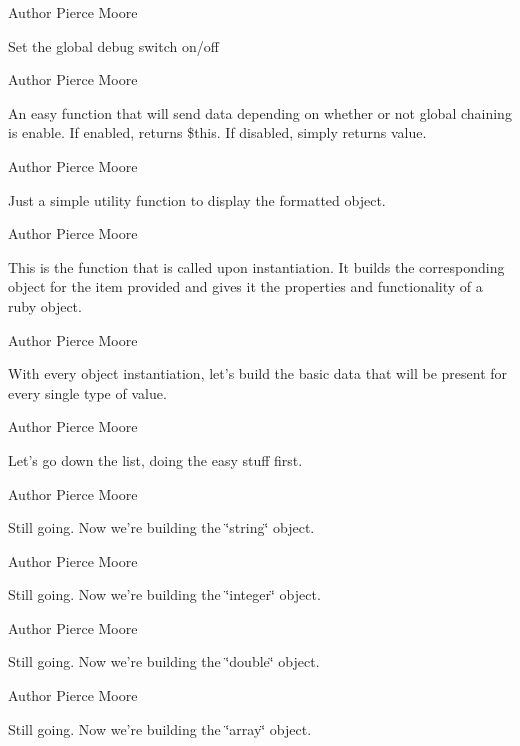 \begin{DoxyAuthor}{Author}
Pierce Moore
\end{DoxyAuthor}
Set the global debug switch on/off

\begin{DoxyAuthor}{Author}
Pierce Moore
\end{DoxyAuthor}
An easy function that will send data depending on whether or not global chaining is enable. If enabled, returns \$this. If disabled, simply returns value.

\begin{DoxyAuthor}{Author}
Pierce Moore
\end{DoxyAuthor}
Just a simple utility function to display the formatted object.

\begin{DoxyAuthor}{Author}
Pierce Moore
\end{DoxyAuthor}
This is the function that is called upon instantiation. It builds the corresponding object for the item provided and gives it the properties and functionality of a ruby object.

\begin{DoxyAuthor}{Author}
Pierce Moore
\end{DoxyAuthor}
With every object instantiation, let's build the basic data that will be present for every single type of value.

\begin{DoxyAuthor}{Author}
Pierce Moore
\end{DoxyAuthor}
Let's go down the list, doing the easy stuff first.

\begin{DoxyAuthor}{Author}
Pierce Moore
\end{DoxyAuthor}
Still going. Now we're building the \char`\"{}string\char`\"{} object.

\begin{DoxyAuthor}{Author}
Pierce Moore
\end{DoxyAuthor}
Still going. Now we're building the \char`\"{}integer\char`\"{} object.

\begin{DoxyAuthor}{Author}
Pierce Moore
\end{DoxyAuthor}
Still going. Now we're building the \char`\"{}double\char`\"{} object.

\begin{DoxyAuthor}{Author}
Pierce Moore
\end{DoxyAuthor}
Still going. Now we're building the \char`\"{}array\char`\"{} object.

